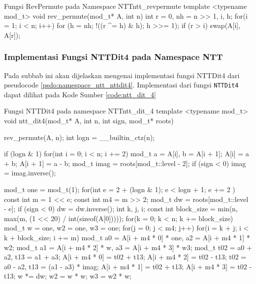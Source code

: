 \begin{code}[firstnumber=1]{Fungsi RevPermute pada Namespace NTT}{ntt_revpermute}
	template <typename mod_t>
    void rev_permute(mod_t* A, int n) {
        int r = 0, nh = n >> 1, i, h;
        for(i = 1; i < n; i++) {
            for (h = nh; !((r ^= h) & h); h >>= 1);
            if (r > i) swap(A[i], A[r]);
        }
    }
\end{code}

\subsubsection{Implementasi Fungsi NTTDit4 pada Namespace NTT}
Pada subbab ini akan dijelaskan mengenai implementasi fungsi NTTDit4 dari pseudocode \ref{psdo:namespace_ntt_nttdit4}. Implementasi dari fungsi \texttt{NTTDit4} dapat dilihat pada Kode Sumber \ref{code:ntt_dit_4}

\begin{code}[firstnumber=1]{Fungsi NTTDit4 pada namespace NTT}{ntt_dit_4}
	template <typename mod_t>
    void ntt_dit4(mod_t* A, int n, int sign, mod_t* roots) {
        rev_permute(A, n);
        int logn = __builtin_ctz(n);

        if (logn & 1) for(int i = 0; i < n; i += 2) {
            mod_t a = A[i], b = A[i + 1];
            A[i] = a + b; A[i + 1] = a - b;
        }
        mod_t imag = roots[mod_t::level - 2];
        if (sign < 0) imag = imag.inverse();

        mod_t one = mod_t(1);
        for(int e = 2 + (logn & 1); e < logn + 1; e += 2 ){
            const int m = 1 << e;
            const int m4 = m >> 2;
            mod_t dw = roots[mod_t::level - e];
            if (sign < 0) dw = dw.inverse();
            int k, j, i;
            const int block_size = min(n, max(m, (1 << 20) / int(sizeof(A[0]))));
            for(k = 0; k < n; k += block_size){
                mod_t w = one, w2 = one, w3 = one;
                for(j = 0; j < m4; j++){
                    for(i = k + j; i < k + block_size; i += m) {
                        mod_t a0 = A[i + m4 * 0] * one, a2 = A[i + m4 * 1] * w2;
                        mod_t a1 = A[i + m4 * 2] * w,   a3 = A[i + m4 * 3] * w3;
                        mod_t t02 = a0 + a2, t13 = a1 + a3;
                        A[i + m4 * 0] = t02 + t13; A[i + m4 * 2] = t02 - t13;
                        t02 = a0 - a2, t13 = (a1 - a3) * imag;
                        A[i + m4 * 1] = t02 + t13; A[i + m4 * 3] = t02 - t13;
                    }
                    w *= dw; w2 = w * w; w3 = w2 * w;
                }
            }
        }
    }
\end{code}

